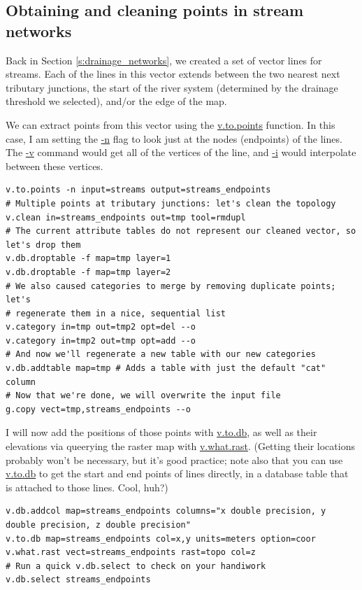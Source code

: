 \documentclass{book}
\begin{document}
\subsection{Obtaining and cleaning points in stream networks}

Back in Section \ref{s:drainage_networks}, we created a set of vector lines for streams. Each of the lines in this vector extends between the two nearest next tributary junctions, the start of the river system (determined by the drainage threshold we selected), and/or the edge of the map.

We can extract points from this vector using the \url{v.to.points} function. In this case, I am setting the \url{-n} flag to look just at the nodes (endpoints) of the lines. The \url{-v} command would get all of the vertices of the line, and \url{-i} would interpolate between these vertices.

\begin{lstlisting}
v.to.points -n input=streams output=streams_endpoints
# Multiple points at tributary junctions: let's clean the topology
v.clean in=streams_endpoints out=tmp tool=rmdupl
# The current attribute tables do not represent our cleaned vector, so let's drop them
v.db.droptable -f map=tmp layer=1
v.db.droptable -f map=tmp layer=2
# We also caused categories to merge by removing duplicate points; let's
# regenerate them in a nice, sequential list
v.category in=tmp out=tmp2 opt=del --o
v.category in=tmp2 out=tmp opt=add --o
# And now we'll regenerate a new table with our new categories
v.db.addtable map=tmp # Adds a table with just the default "cat" column
# Now that we're done, we will overwrite the input file
g.copy vect=tmp,streams_endpoints --o
\end{lstlisting}

I will now add the positions of those points with \url{v.to.db}, as well as their elevations via queerying the raster map with \url{v.what.rast}. (Getting their locations probably won't be necessary, but it's good practice; note also that you can use \url{v.to.db} to get the start and end points of lines directly, in a database table that is attached to those lines. Cool, huh?)

\begin{lstlisting}
v.db.addcol map=streams_endpoints columns="x double precision, y double precision, z double precision"
v.to.db map=streams_endpoints col=x,y units=meters option=coor
v.what.rast vect=streams_endpoints rast=topo col=z
# Run a quick v.db.select to check on your handiwork
v.db.select streams_endpoints
\end{lstlisting}
\end{document}
